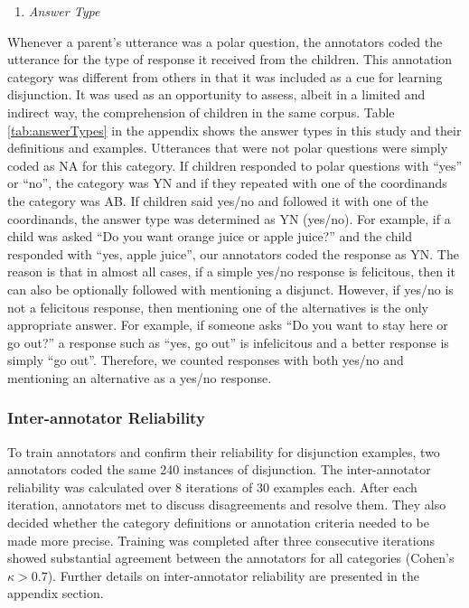 \documentclass[,man,floatsintext]{apa6}
\providecommand{\tightlist}{%
  \setlength{\itemsep}{0pt}\setlength{\parskip}{0pt}}
\begin{document}
\begin{enumerate}
\def\labelenumi{\arabic{enumi}.}
\setcounter{enumi}{5}
\tightlist
\item
  \emph{Answer Type}
\end{enumerate}

Whenever a parent's utterance was a polar question, the annotators coded the utterance for the type of response it received from the children. This annotation category was different from others in that it was included as a cue for learning disjunction. It was used as an opportunity to assess, albeit in a limited and indirect way, the comprehension of children in the same corpus. Table \ref{tab:answerTypes} in the appendix shows the answer types in this study and their definitions and examples. Utterances that were not polar questions were simply coded as NA for this category. If children responded to polar questions with \enquote{yes} or \enquote{no}, the category was YN and if they repeated with one of the coordinands the category was AB. If children said yes/no and followed it with one of the coordinands, the answer type was determined as YN (yes/no). For example, if a child was asked \enquote{Do you want orange juice or apple juice?} and the child responded with \enquote{yes, apple juice}, our annotators coded the response as YN. The reason is that in almost all cases, if a simple yes/no response is felicitous, then it can also be optionally followed with mentioning a disjunct. However, if yes/no is not a felicitous response, then mentioning one of the alternatives is the only appropriate answer. For example, if someone asks \enquote{Do you want to stay here or go out?} a response such as \enquote{yes, go out} is infelicitous and a better response is simply \enquote{go out}. Therefore, we counted responses with both yes/no and mentioning an alternative as a yes/no response.

\hypertarget{inter-annotator-reliability}{%
\subsubsection{Inter-annotator Reliability}\label{inter-annotator-reliability}}

To train annotators and confirm their reliability for disjunction examples, two annotators coded the same 240 instances of disjunction. The inter-annotator reliability was calculated over 8 iterations of 30 examples each. After each iteration, annotators met to discuss disagreements and resolve them. They also decided whether the category definitions or annotation criteria needed to be made more precise. Training was completed after three consecutive iterations showed substantial agreement between the annotators for all categories (Cohen's \(\kappa > 0.7\)). Further details on inter-annotator reliability are presented in the appendix section.
\end{document}
